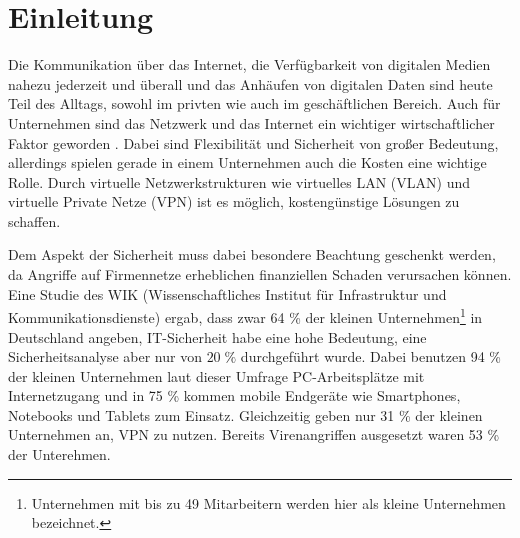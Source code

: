 \chapter{Einleitung}



Die Kommunikation über das Internet, die Verfügbarkeit von digitalen Medien nahezu jederzeit und überall und das Anhäufen von digitalen Daten  sind  heute Teil des Alltags, sowohl im privten wie auch im geschäftlichen Bereich. Auch für Unternehmen  sind das Netzwerk und das Internet ein wichtiger wirtschaftlicher Faktor geworden \cite{lipp2007vpn}. Dabei sind  Flexibilität und Sicherheit von großer Bedeutung, allerdings spielen gerade in einem Unternehmen auch die Kosten eine wichtige Rolle. Durch virtuelle Netzwerkstrukturen wie virtuelles LAN (VLAN) und virtuelle Private Netze (VPN) ist es möglich, kostengünstige Lösungen zu schaffen. 

Dem Aspekt der Sicherheit muss dabei besondere Beachtung geschenkt werden, da Angriffe auf Firmennetze erheblichen finanziellen Schaden verursachen können.\\  

Eine Studie des WIK (Wissenschaftliches Institut für Infrastruktur und Kommunikationsdienste) \cite{wik2017KMU} ergab, dass zwar 64 \% der kleinen Unternehmen\footnote{Unternehmen mit bis zu 49 Mitarbeitern werden hier als kleine Unternehmen bezeichnet.} in Deutschland angeben, IT-Sicherheit habe eine hohe Bedeutung, eine Sicherheitsanalyse aber nur von $20\; \%$ durchgeführt wurde.
Dabei benutzen 94 \% der kleinen Unternehmen laut dieser Umfrage PC-Arbeitsplätze mit Internetzugang und in  75 \%  kommen mobile Endgeräte wie Smartphones, Notebooks und Tablets zum Einsatz. Gleichzeitig geben nur 31 \% der kleinen Unternehmen an, VPN zu nutzen. Bereits Virenangriffen ausgesetzt waren 53 \% der Unterehmen. 
































